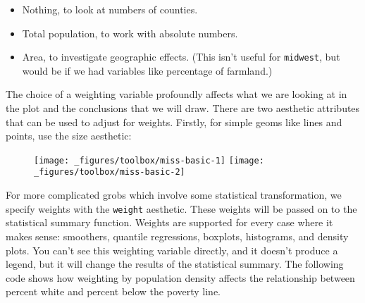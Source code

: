 \begin{itemize}
\tightlist
\item
  Nothing, to look at numbers of counties.
\item
  Total population, to work with absolute numbers.
\item
  Area, to investigate geographic effects. (This isn't useful for
  \texttt{midwest}, but would be if we had variables like percentage of
  farmland.)
\end{itemize}

The choice of a weighting variable profoundly affects what we are
looking at in the plot and the conclusions that we will draw. There are
two aesthetic attributes that can be used to adjust for weights.
Firstly, for simple geoms like lines and points, use the size aesthetic:

\begin{Shaded}
\begin{Highlighting}[]
\OperatorTok{+}\StringTok{ }
\StringTok{  }\NormalTok{()}

\OperatorTok{+}\StringTok{ }
\StringTok{  }\NormalTok{(}\NormalTok{(}\OperatorTok{/}\StringTok{ }\NormalTok{)) }\OperatorTok{+}\StringTok{ }
\StringTok{  }\NormalTok{(}\NormalTok{, } \NormalTok{(}\NormalTok{, }\NormalTok{, }\NormalTok{, }\NormalTok{))}
\end{Highlighting}
\end{Shaded}

\begin{figure}[H]
  \texttt{[image: \_figures/toolbox/miss-basic-1]}%
  \texttt{[image: \_figures/toolbox/miss-basic-2]}
\end{figure}

For more complicated grobs which involve some statistical
transformation, we specify weights with the \texttt{weight} aesthetic.
These weights will be passed on to the statistical summary function.
Weights are supported for every case where it makes sense: smoothers,
quantile regressions, boxplots, histograms, and density plots. You can't
see this weighting variable directly, and it doesn't produce a legend,
but it will change the results of the statistical summary. The following
code shows how weighting by population density affects the relationship
between percent white and percent below the poverty line.

